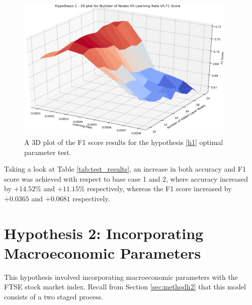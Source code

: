 \documentclass{UoYCSproject}
\begin{document}
\begin{figure}[h]
\includegraphics[width=10.5cm]{h1_f1.png}
\centering
\caption{A 3D plot of the F1 score results for the hypothesis \ref{h1} optimal parameter test.} 
\label{fig:h1_plot_f1}
\end{figure}

Taking a look at Table \ref{tab:test_results}, an increase in both accuracy and F1 score was achieved with respect to base case 1 and 2, where accuracy increased by $+14.52$\% and $+11.15$\% respectively, whereas the F1 score increased by $+0.0365$ and $+0.0681$ respectively.

\section{Hypothesis 2: Incorporating Macroeconomic Parameters}
This hypothesis involved incorporating macroeconomic parameters with the FTSE stock market index. Recall from Section \ref{sec:methodh2} that this model consists of a two staged process.
\end{document}

